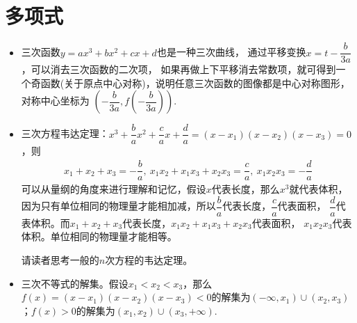 \section{多项式}
\begin{itemize}[leftmargin=\inteval{\myitemleftmargin}pt,itemsep=
   \inteval{\myitemitempsep}pt,topsep=\inteval{\myitemtopsep}pt]
\item 三次函数$ y=ax^3+bx^2+cx+d $也是一种三次曲线，
通过平移变换$ x=t-\dfrac{b}{3a} $，可以消去三次函数的二次项，
如果再做上下平移消去常数项，就可得到一个奇函数(关于原点中心对称)，说明任意三次函数的图像都是中心对称图形，对称中心坐标为 $ (-\dfrac{b}{3a},f(-\dfrac{b}{3a})) $. 

\item 三次方程韦达定理：$ x^3+\dfrac{b}{a}x^2+\dfrac{c}{a}x+
\dfrac{d}{a}=(x-x_1)(x-x_2)(x-x_3)=0$，则
\begin{align}\label{三次方程韦达定理}
    x_1+x_2+x_3=-\dfrac{b}{a},\ x_1x_2+x_1x_3+x_2x_3=\dfrac{c}{a},\ x_1x_2x_3=-\dfrac{d}{a}
\end{align}
可以从量纲的角度来进行理解和记忆，假设$ x $代表长度，那么$ x^3 $就代表体积，
因为只有单位相同的物理量才能相加减，所以$ \dfrac{b}{a} $代表长度，$ \dfrac{c}{a} $代表面积，
$ \dfrac{d}{a} $代表体积。而$ x_1+x_2+x_3 $代表长度，$ x_1x_2+x_1x_3+x_2x_3 $代表面积，
$ x_1x_2x_3 $代表体积。单位相同的物理量才能相等。

请读者思考一般的$ n $次方程的韦达定理。

\item 三次不等式的解集。假设$ x_1<x_2<x_3 $，那么$ f(x)=(x-x_1)(x-x_2)(x-x_3)
<0 $的解集为$ (-\infty,x_1)\cup (x_2,x_3) $；$ f(x)>0 $的解集为$ (x_1,x_2)\cup
(x_3,+\infty) $. 


\end{itemize}
